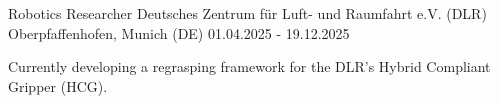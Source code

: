 
\cventry
{Robotics Researcher}
{Deutsches Zentrum für Luft- und Raumfahrt e.V. (DLR)}
{Oberpfaffenhofen, Munich (DE)}
{01.04.2025 - 19.12.2025}
{
    \begin{cvitems}
        \item {Currently developing a regrasping framework for the DLR's Hybrid Compliant Gripper (HCG).}
    \end{cvitems}
}